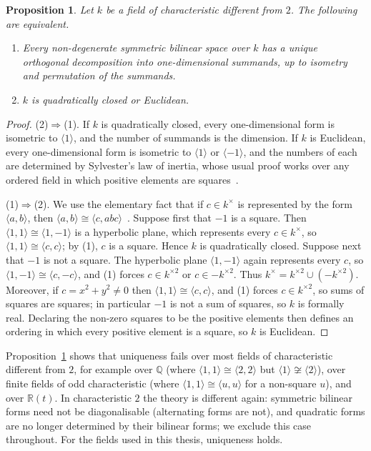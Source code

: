 \documentclass[12pt, a4paper]{report}
\theoremstyle{plain}
\newtheorem{proposition}[theorem]{Proposition}
\theoremstyle{definition}
\theoremstyle{remark}
\theoremstyle{plain}
\newcommand{\RR}{\mathbb{R}}
\newcommand{\QQ}{\mathbb{Q}}
\begin{document}
\begin{proposition}\label{prop:quadratic-uniqueness}
Let $k$ be a field of characteristic different from $2$. The following are equivalent.
\begin{enumerate}
  \item Every non-degenerate symmetric bilinear space over $k$ has a unique orthogonal decomposition into one-dimensional summands, up to isometry and permutation of the summands.
  \item $k$ is quadratically closed or Euclidean.
\end{enumerate}
\end{proposition}
\begin{proof}
(2)$\Rightarrow$(1). If $k$ is quadratically closed, every one-dimensional form is isometric to $\langle 1\rangle$, and the number of summands is the dimension. If $k$ is Euclidean, every one-dimensional form is isometric to $\langle 1\rangle$ or $\langle -1\rangle$, and the numbers of each are determined by Sylvester's law of inertia, whose usual proof works over any ordered field in which positive elements are squares~\cite{Lam2005}.

(1)$\Rightarrow$(2). We use the elementary fact that if $c\in k^\times$ is represented by the form $\langle a,b\rangle$, then $\langle a,b\rangle\cong\langle c,abc\rangle$~\cite{Lam2005}. Suppose first that $-1$ is a square. Then $\langle 1,1\rangle\cong\langle1,-1\rangle$ is a hyperbolic plane, which represents every $c\in k^\times$, so $\langle1,1\rangle\cong\langle c,c\rangle$; by (1), $c$ is a square. Hence $k$ is quadratically closed. Suppose next that $-1$ is not a square. The hyperbolic plane $\langle1,-1\rangle$ again represents every $c$, so $\langle 1,-1\rangle\cong\langle c,-c\rangle$, and (1) forces $c\in k^{\times2}$ or $c\in -k^{\times 2}$. Thus $k^\times=k^{\times2}\cup(-k^{\times2})$. Moreover, if $c=x^2+y^2\neq 0$ then $\langle1,1\rangle\cong\langle c,c\rangle$, and (1) forces $c\in k^{\times 2}$, so sums of squares are squares; in particular $-1$ is not a sum of squares, so $k$ is formally real. Declaring the non-zero squares to be the positive elements then defines an ordering in which every positive element is a square, so $k$ is Euclidean.
\end{proof}

Proposition~\ref{prop:quadratic-uniqueness} shows that uniqueness fails over most fields of characteristic different from $2$, for example over $\QQ$ (where $\langle1,1\rangle\cong\langle2,2\rangle$ but $\langle1\rangle\not\cong\langle2\rangle$), over finite fields of odd characteristic (where $\langle1,1\rangle\cong\langle u,u\rangle$ for a non-square $u$), and over $\RR(t)$. In characteristic $2$ the theory is different again: symmetric bilinear forms need not be diagonalisable (alternating forms are not), and quadratic forms are no longer determined by their bilinear forms; we exclude this case throughout. For the fields used in this thesis, uniqueness holds.
\end{document}
